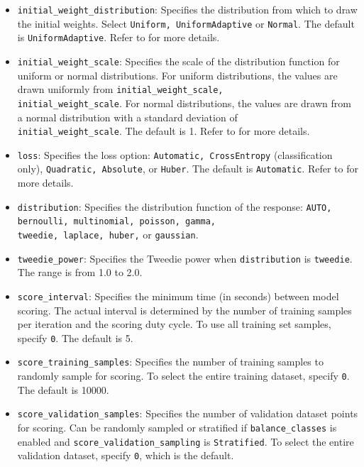 {{{\begin{itemize}
\item \texttt{initial\_weight\_distribution}: Specifies the distribution from which to draw the initial weights. Select \texttt{Uniform, UniformAdaptive} or \texttt{Normal}. The default is \texttt{UniformAdaptive}. Refer to {\textbf{}} for more details.

\item \texttt{initial\_weight\_scale}: Specifies the scale of the distribution function for uniform or normal distributions. For uniform distributions, the values are drawn uniformly from \texttt{initial\_weight\_scale, \\ initial\_weight\_scale}. For normal distributions, the values are drawn from a normal distribution with a standard deviation of \\ \texttt{initial\_weight\_scale}. The default is 1. Refer to {\textbf{}} for more details.

\item \texttt{loss}: Specifies the loss option: \texttt{Automatic, CrossEntropy} (classification only), \texttt{Quadratic, Absolute}, or \texttt{Huber}. The default is \texttt{Automatic}. Refer to {\textbf{}} for more details.

\item \texttt{distribution}: Specifies the distribution function of the response: \texttt{AUTO, bernoulli, multinomial, poisson, gamma, \\ tweedie, laplace, huber,} or \texttt{gaussian}. 

\item \texttt{tweedie\_power}: Specifies the Tweedie power when \texttt{distribution} is  \texttt{tweedie}. The range is from 1.0 to 2.0. 

\item \texttt{score\_interval}: Specifies the minimum time (in seconds) between model scoring. The actual interval is determined by the number of training samples per iteration and the scoring duty cycle. To use all training set samples, specify \texttt{0}. The default is 5.

\item \texttt{score\_training\_samples}: Specifies the number of training samples to randomly sample for scoring. To select the entire training dataset, specify \texttt{0}.  The default is 10000.

\item \texttt{score\_validation\_samples}: Specifies the number of validation dataset points for scoring. Can be randomly sampled or stratified if  \texttt{balance\_classes} is enabled and \texttt{score\_validation\_sampling} is \texttt{Stratified}. To select the entire validation dataset, specify \texttt{0}, which is the default.


\end{itemize}}}}
